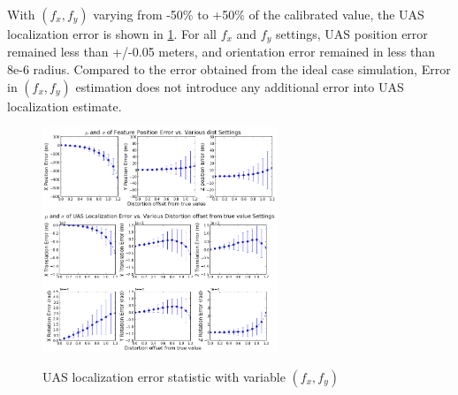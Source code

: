 With $(f_x, f_y)$ varying from -50\% to +50\% of the calibrated
value, the UAS localization error is shown in \ref{fig:simfig45-46}.
For all $f_x$ and $f_y$ settings, UAS position error remained less than
+/-0.05 meters, and orientation error remained in less than 8e-6
radius. Compared to the error obtained from the ideal case simulation,
Error in $(f_x, f_y)$ estimation does not introduce any additional error into
UAS localization estimate. 
\begin{figure}[h]
  \centering
  \includegraphics[width=7cm,keepaspectratio=true]{./Figures/SimulationFigures/Figure45.png}
  \includegraphics[width=7cm,keepaspectratio=true]{./Figures/SimulationFigures/Figure46.png}
  \caption{UAS localization error statistic with variable $(f_x, f_y)$}
  \label{fig:simfig45-46}
\end{figure}


